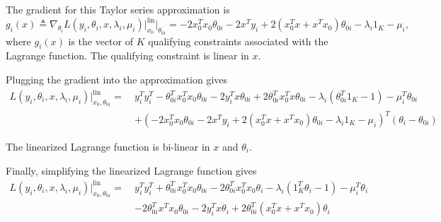 \documentclass[11pt]{article}
\begin{document}
The gradient for this Taylor series approximation is
\begin{equation}
g_i(x) \triangleq \nabla_{\theta_i} L(y_i, \theta_i, x, \lambda_i, \mu_i) \bigg|^{\text{lin}}_{x_0} \bigg|_{\theta_{0i}} = -2 x_0^T x_0 \theta_{0i} -2 x^T y_i + 2 (x_0^T x + x^T x_0) \theta_{0i} - \lambda_i 1_K - \mu_i,
\end{equation}
where $g_i(x)$ is the vector of $K$ qualifying constraints associated with the Lagrange function. The qualifying constraint is linear in $x$.

Plugging the gradient into the approximation gives
\begin{equation}
\begin{split}
L(y_i, \theta_i, x, \lambda_i, \mu_i) \bigg|^{\text{lin}}_{x_0, \theta_{0i}} =\ & y_i^T y_i^T - \theta_{0i}^T x_0^T x_0 \theta_{0i} - 2 y_i^T x \theta_{0i} + 2 \theta_{0i}^T x_0^T x \theta_{0i} - \lambda_i(\theta_{0i}^T 1_K - 1) - \mu_i^T \theta_{0i} \\
& + (-2 x_0^T x_0 \theta_{0i} -2 x^T y_i + 2 (x_0^T x + x^T x_0) \theta_{0i} - \lambda_i 1_K - \mu_i)^T (\theta_i - \theta_{0i})
\end{split}
\end{equation}

The linearized Lagrange function is bi-linear in $x$ and $\theta_i$.

Finally, simplifying the linearized Lagrange function gives
\begin{equation}
\begin{split}
L(y_i, \theta_i, x, \lambda_i, \mu_i) \bigg|^{\text{lin}}_{x_0, \theta_{0i}} =\ & y_i^T y_i^T + \theta_{0i}^T x_0^T x_0 \theta_{0i} -2 \theta_{0i}^T x_0^T x_0 \theta_i - \lambda_i(1_K^T \theta_i - 1) - \mu_i^T \theta_i \\
& - 2 \theta_{0i}^T x^T x_0 \theta_{0i} - 2 y_i^T x \theta_i + 2 \theta_{0i}^T (x_0^T x + x^T x_0) \theta_i
\end{split}
\end{equation}


\small

\end{document}
